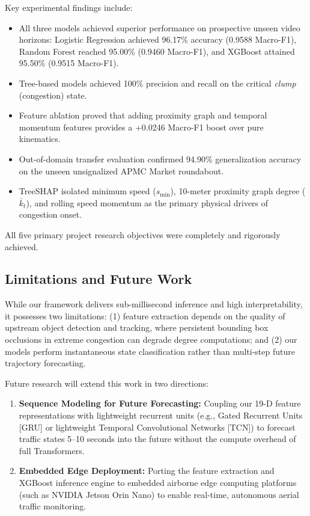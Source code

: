 \documentclass[conference]{IEEEtran}
\begin{document}
Key experimental findings include:
\begin{itemize}
    \item All three models achieved superior performance on prospective unseen video horizons: Logistic Regression achieved 96.17\% accuracy (0.9588 Macro-F1), Random Forest reached 95.00\% (0.9460 Macro-F1), and XGBoost attained 95.50\% (0.9515 Macro-F1).
    \item Tree-based models achieved 100\% precision and recall on the critical \textit{clump} (congestion) state.
    \item Feature ablation proved that adding proximity graph and temporal momentum features provides a +0.0246 Macro-F1 boost over pure kinematics.
    \item Out-of-domain transfer evaluation confirmed 94.90\% generalization accuracy on the unseen unsignalized APMC Market roundabout.
    \item TreeSHAP isolated minimum speed ($s_{\min}$), 10-meter proximity graph degree ($\bar{k}_t$), and rolling speed momentum as the primary physical drivers of congestion onset.
\end{itemize}

All five primary project research objectives were completely and rigorously achieved.

\subsection{Limitations and Future Work}
While our framework delivers sub-millisecond inference and high interpretability, it possesses two limitations: (1) feature extraction depends on the quality of upstream object detection and tracking, where persistent bounding box occlusions in extreme congestion can degrade degree computations; and (2) our models perform instantaneous state classification rather than multi-step future trajectory forecasting.

Future research will extend this work in two directions:
\begin{enumerate}
    \item \textbf{Sequence Modeling for Future Forecasting:} Coupling our 19-D feature representations with lightweight recurrent units (e.g., Gated Recurrent Units [GRU] or lightweight Temporal Convolutional Networks [TCN]) to forecast traffic states 5--10 seconds into the future without the compute overhead of full Transformers.
    \item \textbf{Embedded Edge Deployment:} Porting the feature extraction and XGBoost inference engine to embedded airborne edge computing platforms (such as NVIDIA Jetson Orin Nano) to enable real-time, autonomous aerial traffic monitoring.
\end{enumerate}
\end{document}
